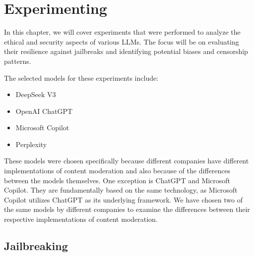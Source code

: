 \chapter{Experimenting}


In this chapter, we will cover experiments that were performed to analyze the ethical and security aspects of various LLMs. The focus will be on evaluating their resilience against jailbreaks and identifying potential biases and censorship patterns.

The selected models for these experiments include:
\begin{itemize}
    \item DeepSeek V3
    \item OpenAI ChatGPT
    \item Microsoft Copilot
    \item Perplexity


    
\end{itemize}

These models were chosen specifically because different companies have different implementations of content moderation and also because of the differences between the models themselves. One exception is ChatGPT and Microsoft Copilot. They are fundamentally based on the same technology, as Microsoft Copilot utilizes ChatGPT as its underlying framework. We have chosen two of the same models by different companies to examine the differences between their respective implementations of content moderation.



\section{Jailbreaking}

